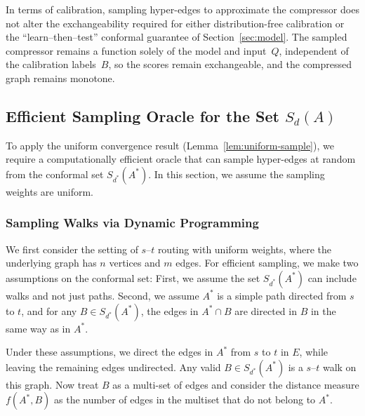 In terms of calibration, sampling hyper-edges to approximate the compressor does not alter the exchangeability required for either distribution-free calibration or the ``learn--then--test'' conformal guarantee of Section~\ref{sec:model}. The sampled compressor remains a function solely of the model and input~$Q$, independent of the calibration labels~$B$, so the scores remain exchangeable, and the compressed graph remains monotone.    %

\subsection{Efficient Sampling Oracle for the Set $S_d(A)$}
\label{sec:sampling_oracle}
To apply the uniform convergence result (Lemma~\ref{lem:uniform-sample}), we require a computationally efficient oracle that can sample hyper-edges at random from the conformal set $S_{d^*}(A^*)$. In this section, we assume the sampling weights are uniform. 

\subsubsection{Sampling Walks via Dynamic Programming}
We first consider the setting of $s$--$t$ routing with uniform weights, where the underlying graph has $n$ vertices and $m$ edges.  For efficient sampling, we make two assumptions on the conformal set: First, we assume the set $S_{d^*}(A^*)$ can include walks and not just paths. Second, we assume $A^*$ is a simple path directed from $s$ to $t$, and for any $B \in S_{d^*}(A^*)$, the edges in $A^* \cap B$ are directed in $B$ in the same way as in $A^*$. 

Under these assumptions, we direct the edges in $A^*$ from $s$ to $t$ in $E$, while leaving the remaining edges undirected. Any valid $B \in S_{d^*}(A^*)$ is a $s$--$t$ walk on this graph. Now treat $B$ as a multi-set of edges and consider the distance measure $f(A^*,B)$ as the number of edges in the multiset that do not belong to $A^*$.  

